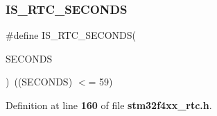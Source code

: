 \subsubsection{I\+S\+\_\+\+R\+T\+C\+\_\+\+S\+E\+C\+O\+N\+DS}
{\footnotesize\ttfamily \#define I\+S\+\_\+\+R\+T\+C\+\_\+\+S\+E\+C\+O\+N\+DS(\begin{DoxyParamCaption}\item[{}]{S\+E\+C\+O\+N\+DS }\end{DoxyParamCaption})~((S\+E\+C\+O\+N\+DS) $<$= 59)}



Definition at line \textbf{ 160} of file \textbf{ stm32f4xx\+\_\+rtc.\+h}.

